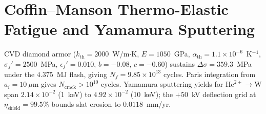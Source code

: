 \section{Coffin--Manson Thermo-Elastic Fatigue and Yamamura Sputtering}
CVD diamond armor ($k_{\text{th}} = 2000$~W/m$\cdot$K, $E = 1050$~GPa,
$\alpha_{\text{th}} = 1.1\times10^{-6}$~K$^{-1}$, $\sigma_f' =
2500$~MPa, $\epsilon_f' = 0.010$, $b = -0.08$, $c = -0.60$) sustains
$\Delta\sigma = 359.3$~MPa under the $4.375$~MJ flash, giving
$N_f = 9.85\times10^{13}$ cycles.  Paris integration from
$a_i = 10~\mu$m gives $N_{\text{crack}} > 10^{10}$ cycles.  Yamamura
sputtering yields for $\mathrm{He}^{2+}\to$W span
$2.14\times10^{-2}$ (1~keV) to $4.92\times10^{-2}$ (10~keV); the
$+50$~kV deflection grid at $\eta_{\text{shield}} = 99.5\%$ bounds slat
erosion to $0.0118$~mm/yr.
